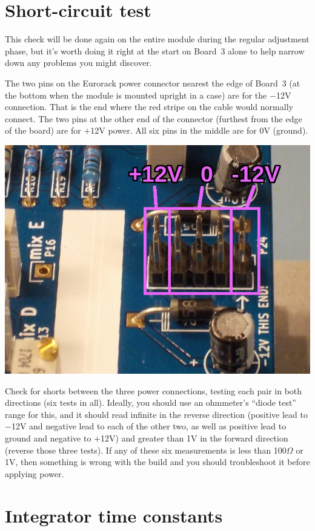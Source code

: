 \section{Short-circuit test}

This check will be done again on the entire module during the regular
adjustment phase, but it's worth doing it right at the start on Board~3
alone to help narrow down any problems you might discover.

The two pins on the Eurorack power connector nearest the edge of Board~3
(at the bottom when the module is mounted upright in a case) are for the
$-$12V connection.  That is the end where the red stripe on the cable would
normally connect.  The two pins at the other end of the connector (furthest
from the edge of the board) are for $+$12V power.  All six pins in the
middle are for 0V (ground).

\noindent\includegraphics[width=\linewidth]{power-pinout.jpg}

Check for shorts between the three power connections, testing each pair in
both directions (six tests in all).  Ideally, you should use an ohmmeter's
``diode test'' range for this, and it should read infinite in the reverse
direction (positive lead to $-$12V and negative lead to each of the other
two, as well as positive lead to ground and negative to $+$12V) and greater
than 1V in the forward direction (reverse those three tests).  If any of
these six measurements is less than 100$\Omega$ or 1V, then something is
wrong with the build and you should troubleshoot it before applying power.

\section{Integrator time constants}

